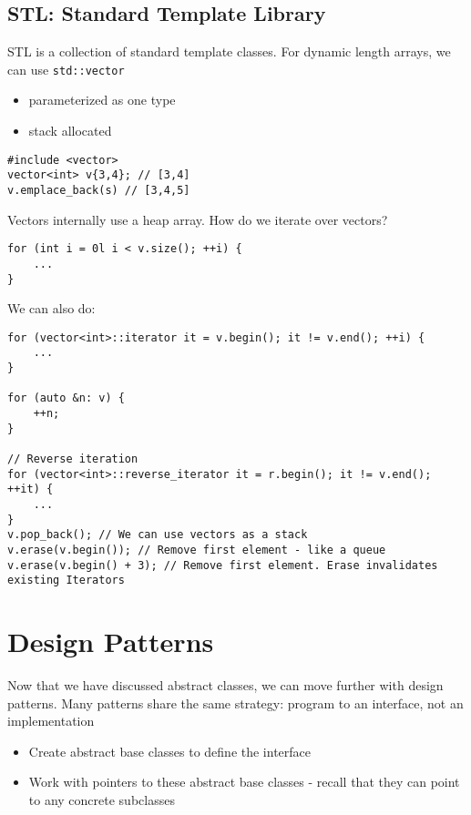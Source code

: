 \documentclass[12pt]{article}
\begin{document}
\subsection{STL: Standard Template Library}
STL is a collection of standard template classes. 
For dynamic length arrays, we can use \lstinline{std::vector}
\begin{itemize}
    \item parameterized as one type
    \item stack allocated
\end{itemize}
\begin{lstlisting}
#include <vector>
vector<int> v{3,4}; // [3,4]
v.emplace_back(s) // [3,4,5]
\end{lstlisting}
Vectors internally use a heap array. How do we iterate over vectors?
\begin{lstlisting}
for (int i = 0l i < v.size(); ++i) {
    ...
}
\end{lstlisting}
We can also do:
\begin{lstlisting}
for (vector<int>::iterator it = v.begin(); it != v.end(); ++i) {
    ...
}

for (auto &n: v) {
    ++n;
}

// Reverse iteration
for (vector<int>::reverse_iterator it = r.begin(); it != v.end(); ++it) {
    ...
}
v.pop_back(); // We can use vectors as a stack
v.erase(v.begin()); // Remove first element - like a queue
v.erase(v.begin() + 3); // Remove first element. Erase invalidates existing Iterators
\end{lstlisting}
\section{Design Patterns}
Now that we have discussed abstract classes, we can move further with design patterns. Many patterns share the same strategy: program to an interface, not an implementation
\begin{itemize}
    \item Create abstract base classes to define the interface
    \item Work with pointers to these abstract base classes - recall that they can point to any concrete subclasses
\end{itemize}
\end{document}
